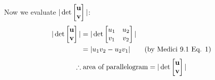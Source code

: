 \documentclass[10pt]{exam}
\begin{document}
{{			Now we evaluate $| \det \begin{bmatrix} {\bf u} \\ {\bf v} \end{bmatrix} |$:
			\begin{align*}
				| \det \begin{bmatrix} {\bf u} \\ {\bf v} \end{bmatrix} | &= | \det \begin{bmatrix} u_1 & u_2 \\ v_1 & v_2 \end{bmatrix} |\\
				&= |u_1v_2 - u_2v_1| \quad\quad \text{(by Medici 9.1 Eq. 1)}
			\end{align*}
			\begin{displaymath}
				\therefore \text{area of parallelogram} = | \det \begin{bmatrix} {\bf u} \\ {\bf v} \end{bmatrix} |
			\end{displaymath}
			}
		}
\end{document}
